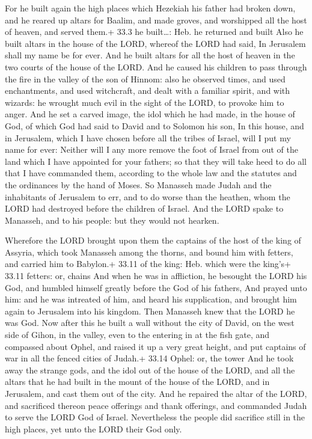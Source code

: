  For he built again the high places which Hezekiah his
father had broken down, and he reared up altars for Baalim, and made
groves, and worshipped all the host of heaven, and served them.+ 33.3 he
built\ldots: Heb. he returned and built  Also he built
altars in the house of the LORD, whereof the LORD had said, In Jerusalem
shall my name be for ever.  And he built altars for all the
host of heaven in the two courts of the house of the LORD. 
And he caused his children to pass through the fire in the valley of the
son of Hinnom: also he observed times, and used enchantments, and used
witchcraft, and dealt with a familiar spirit, and with wizards: he
wrought much evil in the sight of the LORD, to provoke him to anger.
 And he set a carved image, the idol which he had made, in
the house of God, of which God had said to David and to Solomon his son,
In this house, and in Jerusalem, which I have chosen before all the
tribes of Israel, will I put my name for ever:  Neither will
I any more remove the foot of Israel from out of the land which I have
appointed for your fathers; so that they will take heed to do all that I
have commanded them, according to the whole law and the statutes and the
ordinances by the hand of Moses.  So Manasseh made Judah and
the inhabitants of Jerusalem to err, and to do worse than the heathen,
whom the LORD had destroyed before the children of Israel. 
And the LORD spake to Manasseh, and to his people: but they would not
hearken.

 Wherefore the LORD brought upon them the captains of the
host of the king of Assyria, which took Manasseh among the thorns, and
bound him with fetters, and carried him to Babylon.+ 33.11 of the king:
Heb. which were the king's+ 33.11 fetters: or, chains  And
when he was in affliction, he besought the LORD his God, and humbled
himself greatly before the God of his fathers,  And prayed
unto him: and he was intreated of him, and heard his supplication, and
brought him again to Jerusalem into his kingdom. Then Manasseh knew that
the LORD he was God.  Now after this he built a wall
without the city of David, on the west side of Gihon, in the valley,
even to the entering in at the fish gate, and compassed about Ophel, and
raised it up a very great height, and put captains of war in all the
fenced cities of Judah.+ 33.14 Ophel: or, the tower  And he
took away the strange gods, and the idol out of the house of the LORD,
and all the altars that he had built in the mount of the house of the
LORD, and in Jerusalem, and cast them out of the city.  And
he repaired the altar of the LORD, and sacrificed thereon peace
offerings and thank offerings, and commanded Judah to serve the LORD God
of Israel.  Nevertheless the people did sacrifice still in
the high places, yet unto the LORD their God only.

